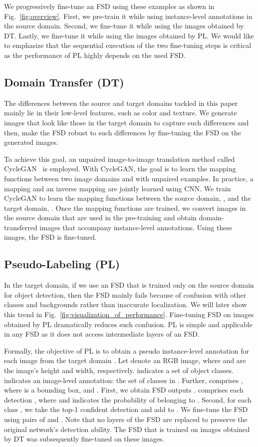 \documentclass[10pt,twocolumn,letterpaper]{article}
\newcommand{\Fref}[1]{Fig.~\ref{#1}}
\begin{document}
We progressively fine-tune an FSD using these examples as shown in \Fref{fig:overview}.
First, we pre-train it while using instance-level annotations in the source domain.
Second, we fine-tune it while using the images obtained by DT.
Lastly, we fine-tune it while using the images obtained by PL.
We would like to emphasize that the sequential execution of the two fine-tuning steps is critical as the performance of PL highly depends on the used FSD.

\subsection{Domain Transfer (DT)}
\label{subsec:domain_transfer}
The differences between the source and target domains tackled in this paper mainly lie in their low-level features, such as color and texture.
We generate images that look like those in the target domain to capture such differences and then, make the FSD robust to such differences by fine-tuning the FSD on the generated images.

To achieve this goal, an unpaired image-to-image translation method called CycleGAN~\cite{zhu2017unpaired} is employed.
With CycleGAN, the goal is to learn the mapping functions between two image domains  and  with unpaired examples.
In practice, a mapping  and an inverse mapping  are jointly learned using CNN.
We train CycleGAN to learn the mapping functions between the source domain, , and the target domain, .
Once the mapping functions are trained, we convert images in the source domain that are used in the pre-training and obtain domain-transferred images that accompany instance-level annotations.
Using these images, the FSD is fine-tuned.

\subsection{Pseudo-Labeling (PL)}
In the target domain, if we use an FSD that is trained only on the source domain for object detection, then the FSD mainly fails because of confusion with other classes and backgrounds rather than inaccurate localization.
We will later show this trend in \Fref{fig:visualization_of_performance}.
Fine-tuning FSD on images obtained by PL dramatically reduces such confusion.
PL is simple and applicable in any FSD as it does not access intermediate layers of an FSD.

Formally, the objective of PL is to obtain a pseudo instance-level annotation  for each image  from the target domain .
Let  denote an RGB image, where  and  are the image's height and width, respectively.
 indicates a set of object classes.
 indicates an image-level annotation: the set of classes in .
Further,  comprises , where  is a bounding box, and .
First, we obtain FSD outputs .
 comprises each detection , where  and  indicates the probability of  belonging to .
Second, for each class , we take the top-1 confident detection  and add  to .
We fine-tune the FSD using pairs of  and .
Note that no layers of the FSD are replaced to preserve the original network's detection ability.
The FSD that is trained on images obtained by DT was subsequently fine-tuned on these images.
\end{document}
